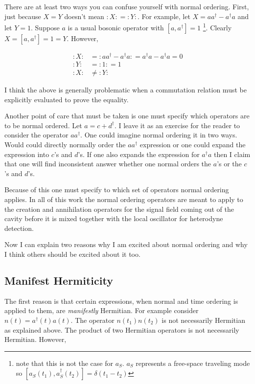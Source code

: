 \documentclass[12pt]{article}
\begin{document}
There are at least two ways you can confuse yourself with normal ordering. First, just because $X=Y$ doesn't mean $:X: = :Y:$. For example, let $X = aa^{\dag}-a^{\dag}a$ and let $Y=1$. Suppose $a$ is a usual bosonic operator with $[a,a^{\dag}]=1$ \footnote{note that this is not the case for $a_S$. $a_S$ represents a free-space traveling mode so $[a_S(t_1),a_S^{\dag}(t_2)] = \delta(t_1-t_2)$}. Clearly $X=[a,a^{\dag}]=1=Y$. However,

\begin{align}
:X: &= :aa^{\dag} - a^{\dag}a: = a^{\dag}a - a^{\dag}a = 0\\
:Y: &= :1: = 1\\
:X: &\neq :Y:
\end{align}

I think the above is generally problematic when a commutation relation must be explicitly evaluated to prove the equality.

Another point of care that must be taken is one must specify which operators are to be normal ordered. Let $a=c+d^{\dag}$. I leave it as an exercise for the reader to consider the operator $aa^{\dag}$. One could imagine normal ordering it in two ways. Would could directly normally order the $aa^{\dag}$ expression or one could expand the expression into $c$'s and $d$'s. If one also expands the expression for $a^{\dag}a$ then I claim that one will find inconsistent answer whether one normal orders the $a$'s or the $c$'s and $d$'s.

Because of this one must specify to which set of operators normal ordering applies. In all of this work the normal ordering operators are meant to apply to the creation and annihilation operators for the signal field coming out of the cavity before it is mixed together with the local oscillator for heterodyne detection.

Now I can explain two reasons why I am excited about normal ordering and why I think others should be excited about it too.

\subsection{Manifest Hermiticity}

The first reason is that certain expressions, when normal and time ordering is applied to them, are \textit{manifestly} Hermitian.  For example consider $n(t) = a^{\dag}(t)a(t)$. The operator $n(t_1)n(t_2)$ is not necessarily Hermitian as explained above. The product of two Hermitian operators is not necessarily Hermitian. However,
\end{document}
